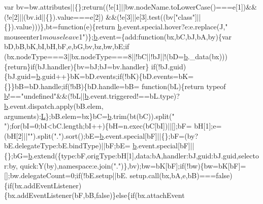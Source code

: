 \begin{DoxyCode}
      var bv=bw.attributes||\{\};\textcolor{keywordflow}{return}((!e[1]||bw.nodeName.toLowerCase()===e[1])&&(!e[2]||(bv.id||\{\}).value===e[2])
      &&(!e[3]||e[3].test((bv[\textcolor{stringliteral}{"class"}]||\{\}).value)))\},bt=\textcolor{keyword}{function}(e)\{\textcolor{keywordflow}{return} \hyperlink{a00039_aa4026ad5544b958e54ce5e106fa1c805}{b}.event.special.hover?e:e.replace(J,\textcolor{stringliteral}{"
      mouseenter$1 mouseleave$1"})\};\hyperlink{a00039_aa4026ad5544b958e54ce5e106fa1c805}{b}.event=\{add:\textcolor{keyword}{function}(bx,bC,bJ,bA,by)\{var bD,bB,bK,bI,bH,bF,e,bG,bv,bz,bw,bE;\textcolor{keywordflow}{if}
      (bx.nodeType===3||bx.nodeType===8||!bC||!bJ||!(bD=\hyperlink{a00039_aa4026ad5544b958e54ce5e106fa1c805}{b}.\_data(bx)))\{\textcolor{keywordflow}{return}\}\textcolor{keywordflow}{if}(bJ.handler)\{bv=bJ;bJ=bv.handler\}\textcolor{keywordflow}{
      if}(!bJ.guid)\{bJ.guid=\hyperlink{a00039_aa4026ad5544b958e54ce5e106fa1c805}{b}.guid++\}bK=bD.events;\textcolor{keywordflow}{if}(!bK)\{bD.events=bK=\{\}\}bB=bD.handle;\textcolor{keywordflow}{if}(!bB)\{bD.handle=bB=\textcolor{keyword}{
      function}(bL)\{\textcolor{keywordflow}{return} typeof \hyperlink{a00039_aa4026ad5544b958e54ce5e106fa1c805}{b}!==\textcolor{stringliteral}{"undefined"}&&(!bL||\hyperlink{a00039_aa4026ad5544b958e54ce5e106fa1c805}{b}.event.triggered!==bL.type)?\hyperlink{a00039_aa4026ad5544b958e54ce5e106fa1c805}{b}.event.dispatch.apply(bB.elem,
      arguments):\hyperlink{a00039_a38ee4c0b5f4fe2a18d0c783af540d253}{L}\};bB.elem=bx\}bC=\hyperlink{a00039_aa4026ad5544b958e54ce5e106fa1c805}{b}.trim(bt(bC)).split(\textcolor{stringliteral}{" "});\textcolor{keywordflow}{for}(bI=0;bI<bC.length;bI++)\{bH=n.exec(bC[bI])||[];bF=
      bH[1];e=(bH[2]||\textcolor{stringliteral}{""}).split(\textcolor{stringliteral}{"."}).sort();bE=\hyperlink{a00039_aa4026ad5544b958e54ce5e106fa1c805}{b}.event.special[bF]||\{\};bF=(by?bE.delegateType:bE.bindType)||bF;bE=
      \hyperlink{a00039_aa4026ad5544b958e54ce5e106fa1c805}{b}.event.special[bF]||\{\};bG=\hyperlink{a00039_aa4026ad5544b958e54ce5e106fa1c805}{b}.extend(\{type:bF,origType:bH[1],data:bA,handler:bJ,guid:bJ.guid,selector:by,
      quick:Y(by),\textcolor{keyword}{namespace}:e.join(\textcolor{stringliteral}{"."})\},bv);bw=bK[bF];\textcolor{keywordflow}{if}(!bw)\{bw=bK[bF]=[];bw.delegateCount=0;\textcolor{keywordflow}{if}(!bE.setup||bE.
      setup.call(bx,bA,e,bB)===\textcolor{keyword}{false})\{\textcolor{keywordflow}{if}(bx.addEventListener)\{bx.addEventListener(bF,bB,\textcolor{keyword}{false})\}\textcolor{keywordflow}{else}\{\textcolor{keywordflow}{if}(bx.attachEvent

\end{DoxyCode}
